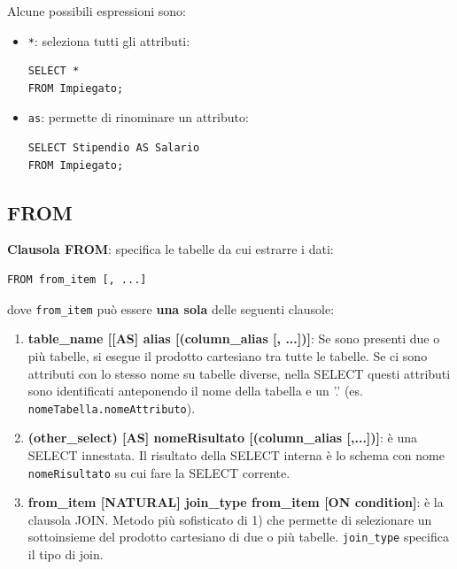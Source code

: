 \documentclass[a4paper]{article}
\begin{document}
\vspace{1em}
\noindent
Alcune possibili espressioni sono:
\begin{itemize}
  \item \texttt{*}: seleziona tutti gli attributi:
\begin{lstlisting}
SELECT *
FROM Impiegato;
\end{lstlisting}

  \item \texttt{as}: permette di rinominare un attributo:
\begin{lstlisting}
SELECT Stipendio AS Salario
FROM Impiegato;
\end{lstlisting}
\end{itemize}

\subsection{FROM}
\textbf{Clausola FROM}: specifica le tabelle da cui estrarre i dati:
\begin{lstlisting}
FROM from_item [, ...]
\end{lstlisting}
dove \texttt{from\_item} può essere \textbf{una sola} delle seguenti clausole:
\begin{enumerate}
  \item \textbf{table\_name [[AS] alias [(column\_alias [, ...])]}: Se sono presenti due
    o più tabelle, si esegue il prodotto cartesiano tra tutte le tabelle. Se ci sono
    attributi con lo stesso nome su tabelle diverse, nella SELECT questi attributi
    sono identificati anteponendo il nome della tabella e un '.' (es. \texttt{nomeTabella.nomeAttributo}).

  \item \textbf{(other\_select) [AS] nomeRisultato [(column\_alias [,...])]}: è una SELECT
    innestata. Il risultato della SELECT interna è lo schema con nome \texttt{nomeRisultato}
    su cui fare la SELECT corrente.

  \item \textbf{from\_item [NATURAL] join\_type from\_item [ON condition]}: è la clausola JOIN. Metodo
    più sofisticato di 1) che permette di selezionare un sottoinsieme del prodotto cartesiano
    di due o più tabelle. \texttt{join\_type} specifica il tipo di join.
\end{enumerate}
\end{document}
